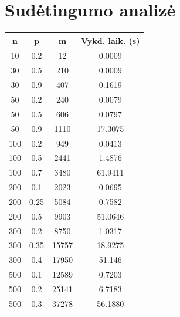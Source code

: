 \documentclass{VUMIFInfKursinis}
\begin{document}
\section{Sudėtingumo analizė}
\begin{centering}
\begin{tabular}{c c c c}
  \hline
  n & p & m & Vykd. laik. (s) \\
  \hline
  10  &  0.2   & 12 & 0.0009 \\
  30  &  0.5   & 210 & 0.0009 \\
  30  &  0.9   & 407 & 0.1619 \\
  50  &  0.2   & 240 & 0.0079 \\
  50  &  0.5   & 606 & 0.0797 \\
  50  &  0.9   & 1110 & 17.3075 \\
  100 &  0.2   & 949 & 0.0413 \\
  100 &  0.5   & 2441 & 1.4876 \\
  100 &  0.7   & 3480 & 61.9411 \\
  200 &  0.1   & 2023 & 0.0695 \\
  200 &  0.25  & 5084 & 0.7582 \\
  200 &  0.5  & 9903 & 51.0646 \\
  300 &  0.2   & 8750 & 1.0317 \\
  300 &  0.35   & 15757 & 18.9275 \\
  300 &  0.4   & 17950 & 51.146 \\
  500 &  0.1   & 12589 & 0.7203 \\
  500 &  0.2   & 25141 & 6.7183 \\
  500 &  0.3   & 37278 & 56.1880 \\
  \hline
\end{tabular}
\end{centering}
\end{document}
